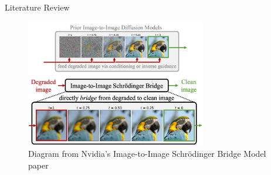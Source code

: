 




\begin{frame}{Literature Review}
    \centering
    \begin{figure}
        \includegraphics[height=0.7\textheight,width=0.7\textwidth,keepaspectratio]{images/mm_1.png}
        \caption{Diagram from Nvidia's Image-to-Image Schr\"odinger Bridge Model paper}
    \end{figure}
\end{frame}

